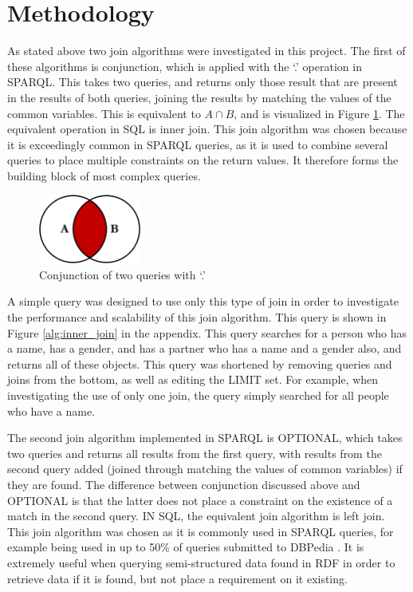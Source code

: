\documentclass[10pt,a4paper]{article}
\begin{document}
	\section*{Methodology}
	
	As stated above two join algorithms were investigated in this project. The first of these algorithms is conjunction, which is applied with the `.' operation in SPARQL. This takes two queries, and returns only those result that are present in the results of both queries, joining the results by matching the values of the common variables. This is equivalent to $A\cap B$, and is visualized in Figure \ref{inner_join}. The equivalent operation in SQL is inner join. This join algorithm was chosen because it is exceedingly common in SPARQL queries, as it is used to combine several queries to place multiple constraints on the return values. It therefore forms the building block of most complex queries.
		
	\begin{figure}
		\vspace{-1em}
		\centering
		\includegraphics[width=0.3\textwidth]{figures/inner_join}
		\caption{Conjunction of two queries with `.'}
		\label{inner_join}
	\end{figure}

	A simple query was designed to use only this type of join in order to investigate the performance and scalability of this join algorithm. This query is shown in Figure \ref{alg:inner_join} in the appendix. This query searches for a person who has a name, has a gender, and has a partner who has a name and a gender also, and returns all of these objects. This query was shortened by removing queries and joins from the bottom, as well as editing the LIMIT set. For example, when investigating the use of only one join, the query simply searched for all people who have a name.
	
	The second join algorithm implemented in SPARQL is OPTIONAL, which takes two queries and returns all results from the first query, with results from the second query added (joined through matching the values of common variables) if they are found. The difference between conjunction discussed above and OPTIONAL is that the latter does not place a constraint on the existence of a match in the second query. IN SQL, the equivalent join algorithm is left join. This join algorithm was chosen as it is commonly used in SPARQL queries, for example being used in up to 50\% of queries submitted to DBPedia \cite{Atre}. It is extremely useful when querying semi-structured data found in RDF in order to retrieve data if it is found, but not place a requirement on it existing.
	
\end{document}
